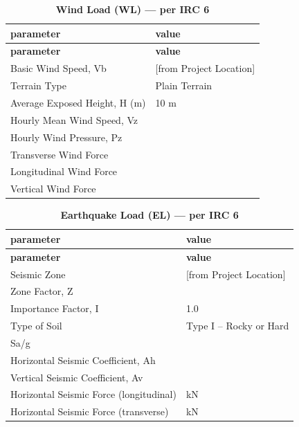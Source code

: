 \documentclass[12pt,a4paper]{report}
\numberwithin{table}{chapter}
\numberwithin{figure}{chapter}
\begin{document}
\vspace{1em}
\begin{longtable}{|L{5.5cm}|p{10.0cm}|}
\caption{\textbf{Wind Load (WL) --- per IRC 6}}
\hline
{} \textbf{parameter} & \textbf{value} \\
\hline
\endfirsthead
\hline
{} \textbf{parameter} & \textbf{value} \\
\hline
\endhead
\textnormal{Basic Wind Speed, Vb} &  [from Project Location] \\[6pt]
\hline
\textnormal{Terrain Type} & Plain Terrain \\[6pt]
\hline
\textnormal{Average Exposed Height, H (m)} & 10 m \\[6pt]
\hline
\textnormal{Hourly Mean Wind Speed, Vz} &  \\[6pt]
\hline
\textnormal{Hourly Wind Pressure, Pz} &  \\[6pt]
\hline
\textnormal{Transverse Wind Force} &  \\[6pt]
\hline
\textnormal{Longitudinal Wind Force} &  \\[6pt]
\hline
\textnormal{Vertical Wind Force} &  \\[6pt]
\hline
\end{longtable}

\vspace{1em}
\begin{longtable}{|L{5.5cm}|p{10.0cm}|}
\caption{\textbf{Earthquake Load (EL) --- per IRC 6}}
\hline
{} \textbf{parameter} & \textbf{value} \\
\hline
\endfirsthead
\hline
{} \textbf{parameter} & \textbf{value} \\
\hline
\endhead
\textnormal{Seismic Zone} &  [from Project Location] \\[6pt]
\hline
\textnormal{Zone Factor, Z} &  \\[6pt]
\hline
\textnormal{Importance Factor, I} & 1.0 \\[6pt]
\hline
\textnormal{Type of Soil} & Type I – Rocky or Hard \\[6pt]
\hline
\textnormal{Sa/g} &  \\[6pt]
\hline
\textnormal{Horizontal Seismic Coefficient, Ah} &  \\[6pt]
\hline
\textnormal{Vertical Seismic Coefficient, Av} &  \\[6pt]
\hline
\textnormal{Horizontal Seismic Force (longitudinal)} &  kN \\[6pt]
\hline
\textnormal{Horizontal Seismic Force (transverse)} &  kN \\[6pt]
\hline
\end{longtable}
\end{document}
